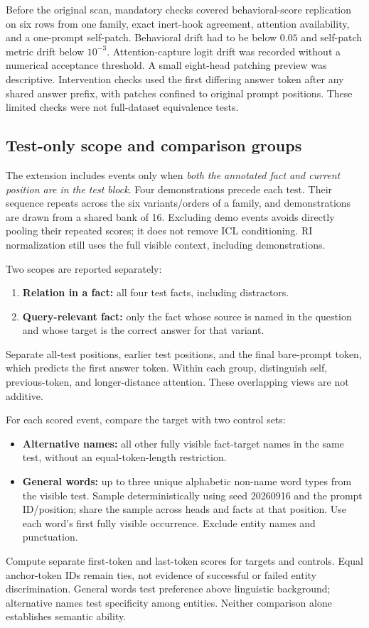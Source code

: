 Before the original scan, mandatory checks covered behavioral-score replication on six rows from one family, exact inert-hook agreement, attention availability, and a one-prompt self-patch. Behavioral drift had to be below $0.05$ and self-patch metric drift below $10^{-3}$. Attention-capture logit drift was recorded without a numerical acceptance threshold. A small eight-head patching preview was descriptive. Intervention checks used the first differing answer token after any shared answer prefix, with patches confined to original prompt positions. These limited checks were not full-dataset equivalence tests.

\subsection{Test-only scope and comparison groups}

The extension includes events only when \emph{both the annotated fact and current position are in the test block}. Four demonstrations precede each test. Their sequence repeats across the six variants/orders of a family, and demonstrations are drawn from a shared bank of 16. Excluding demo events avoids directly pooling their repeated scores; it does not remove ICL conditioning. RI normalization still uses the full visible context, including demonstrations.

Two scopes are reported separately:
\begin{enumerate}[itemsep=1pt]
\item \textbf{Relation in a fact:} all four test facts, including distractors.
\item \textbf{Query-relevant fact:} only the fact whose source is named in the question and whose target is the correct answer for that variant.
\end{enumerate}
Separate all-test positions, earlier test positions, and the final bare-prompt token, which predicts the first answer token. Within each group, distinguish self, previous-token, and longer-distance attention. These overlapping views are not additive.

For each scored event, compare the target with two control sets:
\begin{itemize}[itemsep=1pt]
\item \textbf{Alternative names:} all other fully visible fact-target names in the same test, without an equal-token-length restriction.
\item \textbf{General words:} up to three unique alphabetic non-name word types from the visible test. Sample deterministically using seed 20260916 and the prompt ID/position; share the sample across heads and facts at that position. Use each word's first fully visible occurrence. Exclude entity names and punctuation.
\end{itemize}
Compute separate first-token and last-token scores for targets and controls. Equal anchor-token IDs remain ties, not evidence of successful or failed entity discrimination. General words test preference above linguistic background; alternative names test specificity among entities. Neither comparison alone establishes semantic ability.


